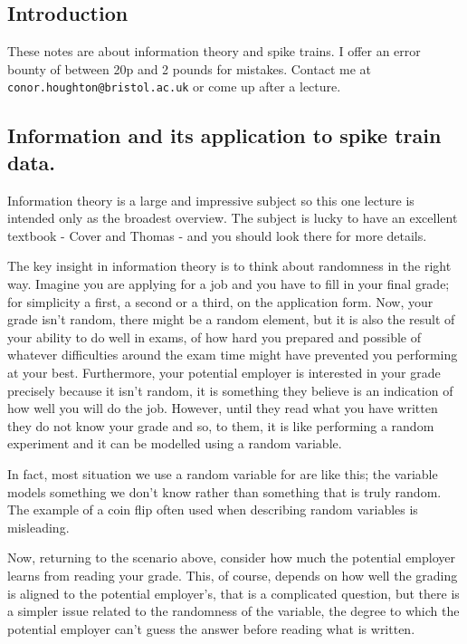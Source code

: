 \documentclass[11pt,a4paper]{scrartcl}
\begin{document}
\subsection*{Introduction}
These notes are about information theory and spike trains. I offer an
error bounty of between 20p and 2 pounds for mistakes. Contact me at
\texttt{conor.houghton@bristol.ac.uk} or come up after a lecture.

\subsection*{Information and its application to spike train data.}

Information theory is a large and impressive subject so this one
lecture is intended only as the broadest overview. The subject is
lucky to have an excellent textbook - Cover and Thomas - and you
should look there for more details.

The key insight in information theory is to think about randomness in
the right way. Imagine you are applying for a job and you have to fill
in your final grade; for simplicity a first, a second or a third, on
the application form. Now, your grade isn't random, there might be a
random element, but it is also the result of your ability to do well
in exams, of how hard you prepared and possible of whatever
difficulties around the exam time might have prevented you performing
at your best. Furthermore, your potential employer is interested in
your grade precisely because it isn't random, it is something they
believe is an indication of how well you will do the job. However,
until they read what you have written they do not know your grade and
so, to them, it is like performing a random experiment and it can be
modelled using a random variable.

In fact, most situation we use a random variable for are like this;
the variable models something we don't know rather than something that
is truly random. The example of a coin flip often used when
describing random variables is misleading. 

Now, returning to the scenario above, consider how much the potential
employer learns from reading your grade. This, of course, depends on
how well the grading is aligned to the potential employer's, that is a
complicated question, but there is a simpler issue related to the
randomness of the variable, the degree to which the potential employer
can't guess the answer before reading what is written. 
\end{document}
